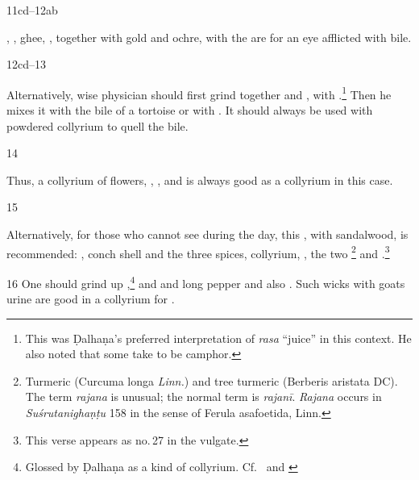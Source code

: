 \begin{translation}
    \item[11cd--12ab]
    
    , , ghee, ,
    together with gold and ochre, with the  are for an
    eye afflicted with bile.
    
    \item [12cd--13] 
    
    Alternatively, wise physician should first grind together 
    and ,  with .\footnote{This was Ḍalhaṇa's preferred interpretation
    of \emph{rasa} “juice” in this context.  He also noted that some take
     to be camphor.}  Then he mixes it with the bile of a
    tortoise or with .  It should always be used
    with powdered collyrium to quell the bile.
    
    \item[14]
    
    Thus, a collyrium of  flowers, ,
    ,  and 
    is always good as a collyrium in this case.
    
    
    \item [15]
    
    Alternatively, for those who cannot see during the day, this ,
    with sandalwood, is recommended: , conch shell and the three
    spices, collyrium, , the two
    \footnote{Turmeric (Curcuma longa \textit{Linn.}) and tree
    turmeric (Berberis aristata DC).  The term \emph{rajana} is unusual; the normal
    term is \emph{rajanī}. \emph{Rajana} occurs in \emph{Suśrutanighaṇṭu} 158 in the
    sense of Ferula asafoetida, Linn.} and .\footnote{This verse appears as no.\,27 in the vulgate.}
    
    \item [16] One should grind up ,\footnote{Glossed by Ḍalhaṇa as
    a kind of collyrium.  Cf.\ \cite[2.M13]{nadk-1954} and \cite[197--198]{shar-1982}}
    and  and long pepper and also .  
    Such wicks with goats urine are good in a collyrium for
    .
    

\end{translation}
